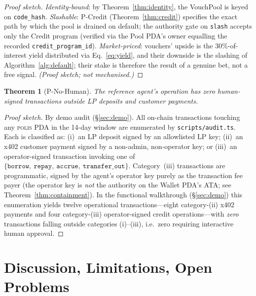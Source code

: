 \documentclass[10pt,conference,letterpaper]{IEEEtran}
\newtheorem{theorem}{Theorem}
\theoremstyle{definition}
\newcommand{\polis}{\textsc{polis}\xspace}
\newcommand{\codehash}{\texttt{code\_hash}}
\begin{document}
\begin{proof}[Proof sketch]
\emph{Identity-bound}: by Theorem~\ref{thm:identity}, the VouchPool is
keyed on \codehash. \emph{Slashable}: P-Credit
(Theorem~\ref{thm:credit}) specifies the exact path by which the pool
is drained on default; the authority gate on \texttt{slash} accepts
only the Credit program (verified via the Pool PDA's owner equalling
the recorded \texttt{credit\_program\_id}). \emph{Market-priced}:
vouchers' upside is the 30\%-of-interest yield distributed via
Eq.~\ref{eq:yield}, and their downside is the slashing of
Algorithm~\ref{alg:default}; their stake is therefore the result of a
genuine bet, not a free signal. \emph{(Proof sketch; not mechanised.)}
\end{proof}

\begin{theorem}[P-No-Human]\label{thm:nohuman}
The reference agent's operation has zero human-signed transactions
outside LP deposits and customer payments.
\end{theorem}

\begin{proof}[Proof sketch]
By demo audit (\S\ref{sec:demo}). All on-chain transactions touching
any \polis PDA in the 14-day window are enumerated by
\texttt{scripts/audit.ts}. Each is classified as: (i)~an LP deposit
signed by an allowlisted LP key; (ii)~an x402 customer payment signed
by a non-admin, non-operator key; or (iii)~an operator-signed
transaction invoking one of $\{\texttt{borrow},\ \texttt{repay},\
\texttt{accrue},\ \texttt{transfer\_out}\}$. Category~(iii)
transactions are programmatic, signed by the agent's operator key
purely as the transaction fee payer (the operator key is \emph{not}
the authority on the Wallet PDA's ATA; see
Theorem~\ref{thm:containment}). In the functional walkthrough
(\S\ref{sec:demo}) this enumeration yields twelve operational
transactions---eight category-(ii) x402 payments and four category-(iii)
operator-signed credit operations---with \emph{zero} transactions falling
outside categories (i)--(iii), i.e.\ zero requiring interactive human
approval.
\end{proof}

\section{Discussion, Limitations, Open Problems}\label{sec:discussion}
\end{document}
